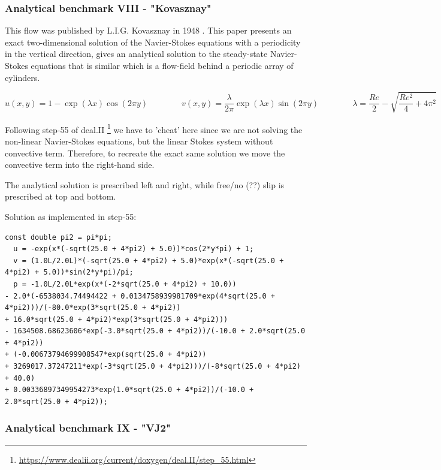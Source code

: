 \bscthesis {}

\subsubsection{Analytical benchmark VIII \label{mms8} - "Kovasznay"}

This flow was published by L.I.G. Kovasznay in 1948 \cite{kova48}. 
This paper presents an exact two-dimensional solution of the Navier-Stokes equations 
with a periodicity in the vertical direction, 
gives an analytical solution to the steady-state Navier-Stokes equations that is similar
which is a flow-field behind a periodic array of cylinders.

\[
u(x,y)=1-\exp(\lambda x) \cos (2\pi y)
\qquad
\qquad
v(x,y)=\frac{\lambda}{2\pi} \exp(\lambda x) \sin (2 \pi y)
\qquad
\qquad
\lambda=\frac{Re}{2}-\sqrt{\frac{Re^2}{4}+4\pi^2}
\]

Following step-55 of deal.II \footnote{\url{https://www.dealii.org/current/doxygen/deal.II/step_55.html}}
we have to 'cheat' here since we are not solving the non-linear Navier-Stokes equations, but the linear Stokes system without convective term. Therefore, to recreate the exact same solution
we move the convective term into the right-hand side.

The analytical solution is prescribed left and right, while free/no (??) slip is prescribed at top and bottom.

Solution as implemented in step-55:
\begin{verbatim}
const double pi2 = pi*pi;
  u = -exp(x*(-sqrt(25.0 + 4*pi2) + 5.0))*cos(2*y*pi) + 1;
  v = (1.0L/2.0L)*(-sqrt(25.0 + 4*pi2) + 5.0)*exp(x*(-sqrt(25.0 + 4*pi2) + 5.0))*sin(2*y*pi)/pi;
  p = -1.0L/2.0L*exp(x*(-2*sqrt(25.0 + 4*pi2) + 10.0)) 
- 2.0*(-6538034.74494422 + 0.0134758939981709*exp(4*sqrt(25.0 + 4*pi2)))/(-80.0*exp(3*sqrt(25.0 + 4*pi2)) 
+ 16.0*sqrt(25.0 + 4*pi2)*exp(3*sqrt(25.0 + 4*pi2))) 
- 1634508.68623606*exp(-3.0*sqrt(25.0 + 4*pi2))/(-10.0 + 2.0*sqrt(25.0 + 4*pi2)) 
+ (-0.00673794699908547*exp(sqrt(25.0 + 4*pi2)) 
+ 3269017.37247211*exp(-3*sqrt(25.0 + 4*pi2)))/(-8*sqrt(25.0 + 4*pi2) + 40.0) 
+ 0.00336897349954273*exp(1.0*sqrt(25.0 + 4*pi2))/(-10.0 + 2.0*sqrt(25.0 + 4*pi2));
\end{verbatim}


\subsubsection{Analytical benchmark IX \label{mms9} - "VJ2"}


